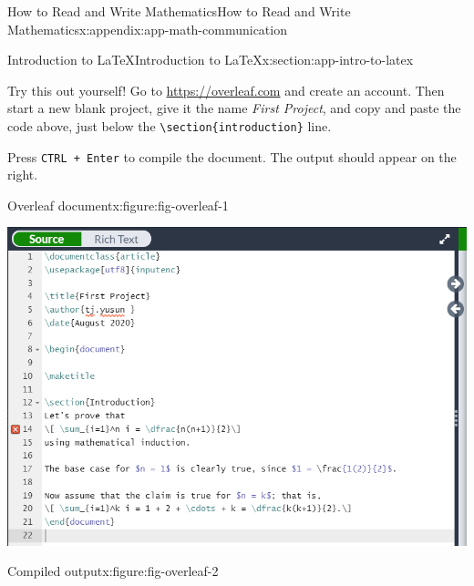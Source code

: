\documentclass[oneside,10pt,]{book}
\newcommand{\mono}[1]{\texttt{#1}}
\newcommand{\alert}[1]{\textbf{\textit{#1}}}
\numberwithin{equation}{section}
\newenvironment{codedisplay}
{\VerbatimEnvironment\begin{center}\begin{lrbox}{\codedisplaybox}\begin{BVerbatim}}
{\end{BVerbatim}\end{lrbox}\usebox{\codedisplaybox}\end{center}}
\begin{document}
\begin{appendixptx}{How to Read and Write Mathematics}{}{How to Read and Write Mathematics}{}{}{x:appendix:app-math-communication}
\begin{sectionptx}{Introduction to \LaTeX{}}{}{Introduction to \LaTeX{}}{}{}{x:section:app-intro-to-latex}
Try this out yourself! Go to \href{https://overleaf.com}{https:\slash{}\slash{}overleaf.com} and create an account. Then start a new blank project, give it the name \emph{First Project}, and copy and paste the code above, just below the \mono{\textbackslash{}section\{introduction\}} line.%
\par
Press \mono{CTRL + Enter} to compile the document. The output should appear on the right.%
\begin{figureptx}{Overleaf document}{x:figure:fig-overleaf-1}{}%
\begin{image}{0.05}{0.9}{0.05}%
\includegraphics[width=\linewidth]{figs/latex-example-overleaf1.png}
\end{image}%
\tcblower
\end{figureptx}%
\begin{figureptx}{Compiled output}{x:figure:fig-overleaf-2}{}%
\begin{image}{0.05}{0.9}{0.05}%

\end{image}
\end{figureptx}
\end{sectionptx}
\end{appendixptx}
\end{document}
